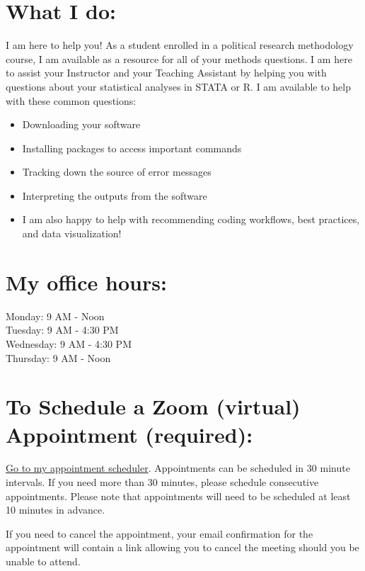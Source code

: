 \documentclass[12pt]{article}
\begin{document}

\cfoot{\thepage}


\section*{What I do:}
I am here to help you! As a student enrolled in a political research methodology course, I am available as a resource for all of your methods questions. I am here to assist your Instructor and your Teaching Assistant by helping you with questions about your statistical analyses in STATA or R. I am available to help with these common questions:
\begin{itemize}
	\item Downloading your software
	\item Installing packages to access important commands
	\item Tracking down the source of error messages
	\item Interpreting the outputs from the software
	\item I am also happy to help with recommending coding workflows, best practices, and data visualization!
\end{itemize}

\section*{My office hours:}
Monday: 9 AM - Noon \\
Tuesday: 9 AM - 4:30 PM \\
Wednesday: 9 AM - 4:30 PM \\
Thursday: 9 AM - Noon \\

\section*{To Schedule a Zoom (virtual) Appointment (required):}

\href{https://calendly.com/damon-c-roberts/methods-lab}{Go to my appointment scheduler}. Appointments can be scheduled in 30 minute intervals. If you need more than 30 minutes, please schedule consecutive appointments. Please note that appointments will need to be scheduled at least 10 minutes in advance.

If you need to cancel the appointment, your email confirmation for the appointment will contain a link allowing you to cancel the meeting should you be unable to attend.
\end{document}
